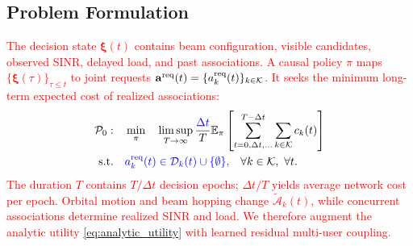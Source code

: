 \documentclass[10pt,letterpaper,journal]{IEEEtran}
\newcommand{\revnew}[1]{\textcolor{red}{#1}}
\begin{document}


\vspace{-2mm}
\subsection{Problem Formulation}
\label{subsec:problem}

\revnew{The decision state $\boldsymbol{\xi}(t)$ contains beam configuration, visible candidates, observed SINR, delayed load, and past associations.}
\revnew{A causal policy $\pi$ maps $\{\boldsymbol{\xi}(\tau)\}_{\tau\le t}$ to joint requests $\mathbf a^{\rm req}(t)=\{a_k^{\rm req}(t)\}_{k\in\mathcal K}$. It seeks the minimum long-term expected cost of realized associations:}
\begin{equation}
\begin{aligned}
\mathcal P_0:\quad &
\min_{\pi}\quad
\limsup_{T\to\infty}
\frac{\textcolor{blue}{\Delta t}}{T}
\mathbb E_{\pi}
\left[
\sum_{t=0,\Delta t,\ldots}^{T-\Delta t}
\sum_{k\in\mathcal K}
c_k(t)
\right] \\
\mathrm{s.t.}\quad&
\textcolor{blue}{a_k^{\rm req}(t)\in\mathcal D_k(t)\cup\{\emptyset\},}
\quad \forall k\in\mathcal K,\ \forall t .
\end{aligned}
\label{eq:problem_sys}
\end{equation}
\revnew{The duration $T$ contains $T/\Delta t$ decision epochs; $\Delta t/T$ yields average network cost per epoch. Orbital motion and beam hopping change $\tilde{\mathcal A}_k(t)$, while concurrent associations determine realized SINR and load. We therefore augment the analytic utility \eqref{eq:analytic_utility} with learned residual multi-user coupling.}
\end{document}
